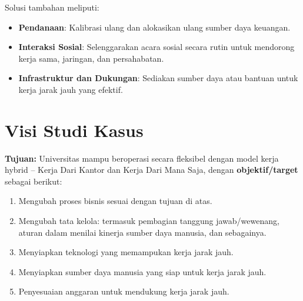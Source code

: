 Solusi tambahan meliputi:
\begin{itemize}
	\item \textbf{Pendanaan}: Kalibrasi ulang dan alokasikan ulang sumber daya keuangan.
	\item \textbf{Interaksi Sosial}: Selenggarakan acara sosial secara rutin untuk mendorong kerja sama, jaringan, dan persahabatan.
	\item \textbf{Infrastruktur dan Dukungan}: Sediakan sumber daya atau bantuan untuk kerja jarak jauh yang efektif.
\end{itemize}

\section{Visi Studi Kasus}
\textbf{Tujuan:} Universitas mampu beroperasi secara fleksibel dengan model kerja hybrid -- Kerja Dari Kantor dan Kerja Dari Mana Saja, dengan \textbf{objektif/target} sebagai berikut:
\begin{enumerate}
	\item Mengubah proses bisnis sesuai dengan tujuan di atas.
	\item Mengubah tata kelola: termasuk pembagian tanggung jawab/wewenang, aturan dalam menilai kinerja sumber daya manusia, dan sebagainya.
	\item Menyiapkan teknologi yang memampukan kerja jarak jauh.
	\item Menyiapkan sumber daya manusia yang siap untuk kerja jarak jauh.
	\item Penyesuaian anggaran untuk mendukung kerja jarak jauh.
\end{enumerate}

%

